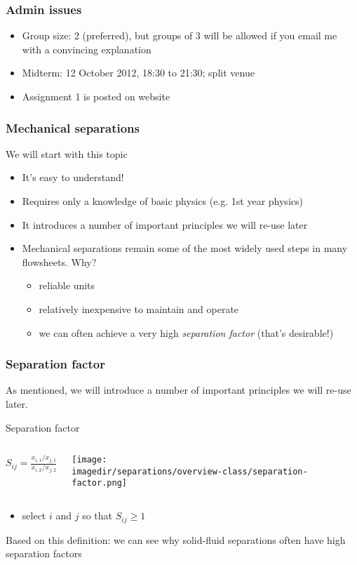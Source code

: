
\begin{frame}\frametitle{Admin issues}
	\begin{itemize}
		\item	Group size: 2 (preferred), but groups of 3 will be allowed if you email me with a convincing explanation
		\item	Midterm: 12 October 2012, 18:30 to 21:30; split venue
		\item	Assignment 1 is posted on website
	\end{itemize}
\end{frame}

\begin{frame}\frametitle{Mechanical separations}
	We will start with this topic
	\begin{itemize}
		\item	It's easy to understand!
		\item	Requires only a knowledge of basic physics (e.g. 1st year physics)
		\item	It introduces a number of important principles we will re-use later
		\item	Mechanical separations remain some of the most widely used steps in many flowsheets. Why?
		\begin{itemize}
			\item	reliable units
			\item	relatively inexpensive to maintain and operate
			\item	we can often achieve a very high \emph{separation factor} (that's desirable!)
		\end{itemize}
	\end{itemize}
\end{frame}

\begin{frame}\frametitle{Separation factor}
	As mentioned, we will introduce a number of important principles we will re-use later.
	
	\begin{exampleblock}{Separation factor}
		\begin{columns}[c]
				$S_{ij} = \displaystyle \frac{x_{i,1} / x_{j,1}}{x_{i,2} / x_{j,2}}$
				\begin{center}
					\texttt{[image: \\imagedir/separations/overview-class/separation-factor.png]}
				\end{center}
		\end{columns} 
	\end{exampleblock}
	
	\begin{itemize}
		\item	select $i$ and $j$ so that $S_{ij} \geq 1$
	\end{itemize}
	
	Based on this definition: we can see why solid-fluid separations often have high separation factors
\end{frame}

